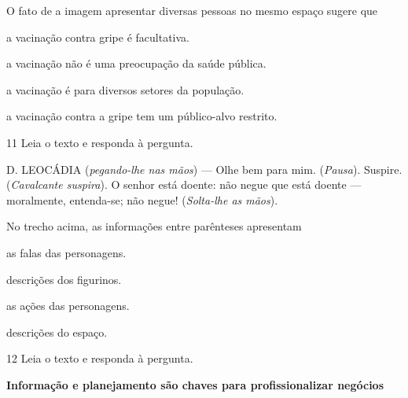 \begin{myquote}
\begin{myescolha}
\begin{myquote}
\end{myquote}

O fato de a imagem apresentar diversas pessoas no mesmo espaço sugere
que

\begin{escolha}
  \item a vacinação contra gripe é facultativa.

  \item a vacinação não é uma preocupação da saúde pública.

  \item a vacinação é para diversos setores da população.

  \item a vacinação contra a gripe tem um público-alvo restrito.
\end{escolha}

\num{11} Leia o texto e responda à pergunta.

\begin{myquote}
D. LEOCÁDIA (\textit{pegando-lhe nas mãos}) --- Olhe bem para mim. 
(\textit{Pausa}). Suspire. (\textit{Cavalcante suspira}). O senhor está
doente: não negue que está doente --- moralmente, entenda-se; não negue!
(\textit{Solta-lhe as mãos}).

\end{myquote}

No trecho acima, as informações entre parênteses apresentam

\begin{escolha}
  \item as falas das personagens.

  \item descrições dos figurinos.

  \item as ações das personagens.

  \item descrições do espaço.
\end{escolha}



\num{12} Leia o texto e responda à pergunta.

\begin{myquote}
\textbf{Informação e planejamento são chaves para profissionalizar negócios}


\end{myquote}
\end{myescolha}
\end{myquote}
